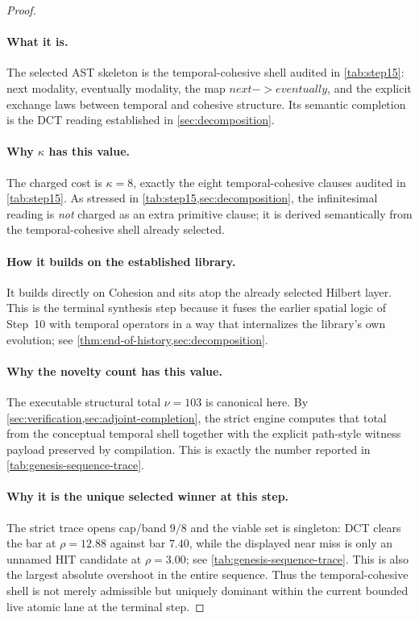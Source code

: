 \documentclass[11pt,a4paper]{article}
\def\to{->}%
\def\bigcirc{next}%
\def\Diamond{eventually}%
\theoremstyle{plain}
\theoremstyle{definition}
\theoremstyle{remark}
\begin{document}
\begin{proof}
\paragraph{What it is.}
The selected AST skeleton is the temporal-cohesive shell audited in
\cref{tab:step15}: next modality, eventually modality, the map
$\bigcirc\to\Diamond$, and the explicit exchange laws between temporal and
cohesive structure.
Its semantic completion is the DCT reading established in
\cref{sec:decomposition}.

\paragraph{Why $\kappa$ has this value.}
The charged cost is $\kappa=8$, exactly the eight temporal-cohesive clauses
audited in \cref{tab:step15}.
As stressed in \cref{tab:step15,sec:decomposition}, the infinitesimal reading is
\emph{not} charged as an extra primitive clause; it is derived semantically from
the temporal-cohesive shell already selected.

\paragraph{How it builds on the established library.}
It builds directly on Cohesion and sits atop the already selected Hilbert layer.
This is the terminal synthesis step because it fuses the earlier spatial logic
of Step~10 with temporal operators in a way that internalizes the library's own
evolution; see \cref{thm:end-of-history,sec:decomposition}.

\paragraph{Why the novelty count has this value.}
The executable structural total $\nu=103$ is canonical here.
By \cref{sec:verification,sec:adjoint-completion}, the strict engine computes
that total from the conceptual temporal shell together with the explicit
path-style witness payload preserved by compilation.
This is exactly the number reported in \cref{tab:genesis-sequence-trace}.

\paragraph{Why it is the unique selected winner at this step.}
The strict trace opens cap/band $9/8$ and the viable set is singleton:
DCT clears the bar at $\rho=12.88$ against bar $7.40$, while the displayed near
miss is only an unnamed HIT candidate at $\rho=3.00$; see
\cref{tab:genesis-sequence-trace}.
This is also the largest absolute overshoot in the entire sequence.
Thus the temporal-cohesive shell is not merely admissible but uniquely dominant
within the current bounded live atomic lane at the terminal step.
\end{proof}
\end{document}
